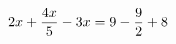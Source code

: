 \documentclass[preview]{standalone}
\begin{document}
\begin{align*}
\special{dvisvgm:raw <g id='unique000'>}2 x + \frac{4 x}{5} - 3 x = 9 - \frac{9}{2} + 8\special{dvisvgm:raw </g>}
\end{align*}
\end{document}
